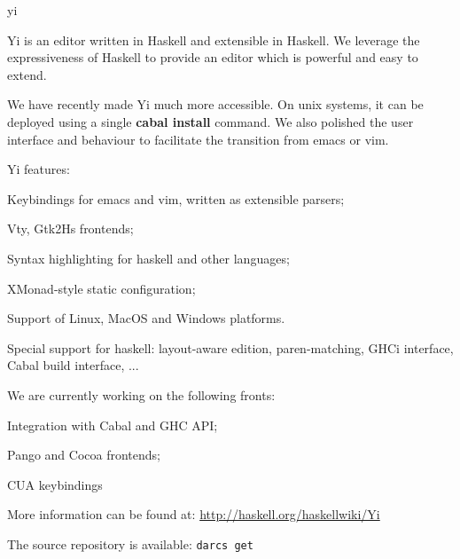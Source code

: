 \begin{hcarentry}[section]{yi}
\label{yi}
\makeheader

Yi is an editor written in Haskell and extensible in Haskell. We leverage the
expressiveness of Haskell to provide an editor which is powerful and easy to
extend.

We have recently made Yi much more accessible. On unix systems, it can be
deployed using a single \textbf{cabal install} command. We also polished the
user interface and behaviour to facilitate the transition from emacs or vim.

Yi features:
\begin{compactitem}
\item Keybindings for emacs and vim, written as extensible parsers;
\item Vty, Gtk2Hs frontends;
\item Syntax highlighting for haskell and other languages;
\item XMonad-style static configuration;
\item Support of Linux, MacOS and Windows platforms.
\item Special support for haskell: layout-aware edition, paren-matching, GHCi interface, Cabal build interface, ...
\end{compactitem}
We are currently working on the following fronts:
\begin{compactitem}
\item Integration with Cabal and GHC API;
\item Pango and Cocoa frontends;
\item CUA keybindings
\end{compactitem}

\FurtherReading
\begin{compactitem}
\item More information can be found at:
 \url{http://haskell.org/haskellwiki/Yi}

\item The source repository is available:
 \texttt{darcs get}
\end{compactitem}
\end{hcarentry}
